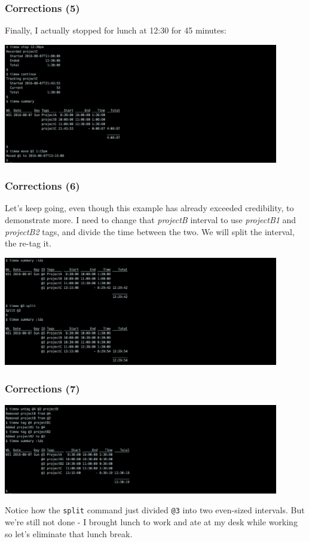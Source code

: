 \documentclass[t,handout]{beamer}
\begin{document}
\begin{frame}[fragile]\frametitle{Corrections (5)}
    Finally, I actually stopped for lunch at 12:30 for 45 minutes:

    \includegraphics[width=12cm]{images/tutorial41.png}
\end{frame}

\begin{frame}[fragile]\frametitle{Corrections (6)}
    Let's keep going, even though this example has already exceeded credibility, to demonstrate more. I need to change that \textit{projectB} interval to use \textit{projectB1} and \textit{projectB2} tags, and divide the time between the two. We will split the interval, the re-tag it.

    \includegraphics[width=12cm]{images/tutorial42a.png}
\end{frame}

\begin{frame}[fragile]\frametitle{Corrections (7)}
    \includegraphics[width=12cm]{images/tutorial42b.png}

    Notice how the \verb=split= command just divided \verb=@3= into two even-sized intervals. But we're still not done - I brought lunch to work and ate at my desk while working so let's eliminate that lunch break.
\end{frame}
\end{document}
